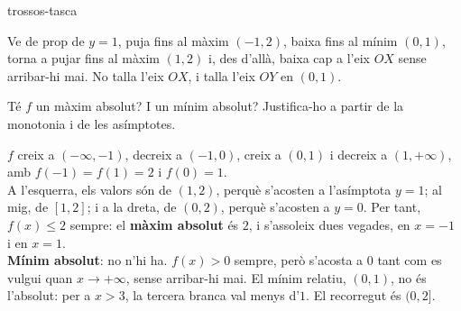 \begin{apartats}
\begin{tria}{trossos-tasca}
\begin{solucio}
Ve de prop de $y=1$, puja fins al màxim $(-1,2)$, baixa fins al mínim $(0,1)$, torna a pujar fins al
màxim $(1,2)$ i, des d'allà, baixa cap a l'eix $OX$ sense arribar-hi mai. No talla l'eix $OX$, i
talla l'eix $OY$ en $(0,1)$.
\begin{center}
\end{center}
\end{solucio}

Té $f$ un màxim absolut? I un mínim absolut? Justifica-ho a partir de la monotonia i de les
asímptotes.

\begin{solucio}
$f$ creix a $(-\infty,-1)$, decreix a $(-1,0)$, creix a $(0,1)$ i decreix a $(1,+\infty)$, amb
$f(-1)=f(1)=2$ i $f(0)=1$.\\
A l'esquerra, els valors són de $(1,2)$, perquè s'acosten a l'asímptota $y=1$; al mig, de $[1,2]$; i a
la dreta, de $(0,2)$, perquè s'acosten a $y=0$. Per tant, $f(x)\le2$ sempre: el \textbf{màxim absolut}
és $2$, i s'assoleix dues vegades, en $x=-1$ i en $x=1$.\\
\textbf{Mínim absolut}: no n'hi ha. $f(x)>0$ sempre, però s'acosta a $0$ tant com es vulgui quan
$x\to+\infty$, sense arribar-hi mai. El mínim relatiu, $(0,1)$, no és l'absolut: per a $x>3$, la
tercera branca val menys d'$1$. El recorregut és $(0,2]$.
\end{solucio}
\end{tria}

\end{apartats}
